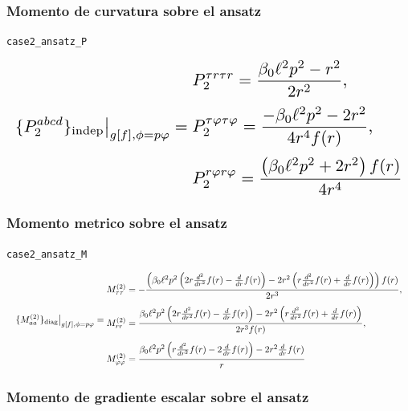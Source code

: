 \documentclass[11pt,a4paper]{article}
\begin{document}
\subsubsection{Momento de curvatura sobre el ansatz}

\noindent\texttt{case2\_ansatz\_P}\par\nopagebreak[4]

\[
\resizebox{\textwidth}{!}{$\displaystyle \{P_2^{abcd}\}_{\mathrm{indep}}\big|_{g[f],\phi=p\varphi} = \begin{aligned}&P_2^{{\tau}{r}{\tau}{r}}=\frac{\beta_{0} \ell^{2} p^{2} - r^{2}}{2 r^{2}},\\[2pt]&P_2^{{\tau}{\varphi}{\tau}{\varphi}}=\frac{- \beta_{0} \ell^{2} p^{2} - 2 r^{2}}{4 r^{4} f{\left(r \right)}},\\[2pt]&P_2^{{r}{\varphi}{r}{\varphi}}=\frac{\left(\beta_{0} \ell^{2} p^{2} + 2 r^{2}\right) f{\left(r \right)}}{4 r^{4}}\end{aligned}$}
\]

\subsubsection{Momento metrico sobre el ansatz}

\noindent\texttt{case2\_ansatz\_M}\par\nopagebreak[4]

\[
\resizebox{\textwidth}{!}{$\displaystyle \{M^{(2)}_{aa}\}_{\rm diag}\big|_{g[f],\phi=p\varphi} = \begin{aligned}&M^{(2)}_{\tau\tau}=- \frac{\left(\beta_{0} \ell^{2} p^{2} \left(2 r \frac{d^{2}}{d r^{2}} f{\left(r \right)} - \frac{d}{d r} f{\left(r \right)}\right) - 2 r^{2} \left(r \frac{d^{2}}{d r^{2}} f{\left(r \right)} + \frac{d}{d r} f{\left(r \right)}\right)\right) f{\left(r \right)}}{2 r^{3}},\\[4pt]&M^{(2)}_{rr}=\frac{\beta_{0} \ell^{2} p^{2} \left(2 r \frac{d^{2}}{d r^{2}} f{\left(r \right)} - \frac{d}{d r} f{\left(r \right)}\right) - 2 r^{2} \left(r \frac{d^{2}}{d r^{2}} f{\left(r \right)} + \frac{d}{d r} f{\left(r \right)}\right)}{2 r^{3} f{\left(r \right)}},\\[4pt]&M^{(2)}_{\varphi\varphi}=\frac{\beta_{0} \ell^{2} p^{2} \left(r \frac{d^{2}}{d r^{2}} f{\left(r \right)} - 2 \frac{d}{d r} f{\left(r \right)}\right) - 2 r^{2} \frac{d}{d r} f{\left(r \right)}}{r}\end{aligned}$}
\]

\subsubsection{Momento de gradiente escalar sobre el ansatz}
\end{document}
